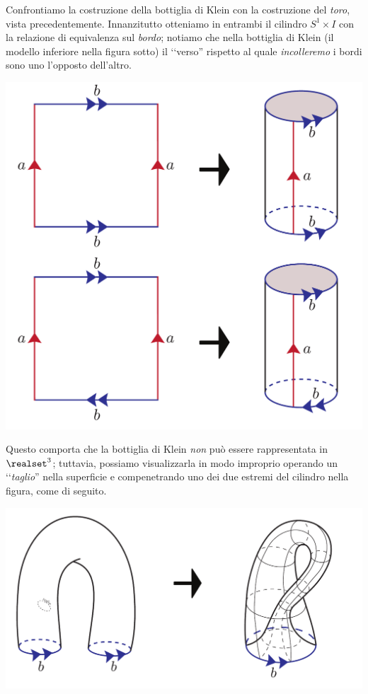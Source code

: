 \begin{examples}
\begin{itemize}
\begin{center}
		\end{center}
		Confrontiamo la costruzione della bottiglia di Klein con la costruzione del \textit{toro}, vista precedentemente. Innanzitutto otteniamo in entrambi il cilindro $S^1\times I$ con la relazione di equivalenza sul \textit{bordo}; notiamo che nella bottiglia di Klein (il modello inferiore nella figura sotto) il ‘‘verso'' rispetto al quale \textit{incolleremo} i bordi sono uno l'opposto dell'altro.
		\begin{center}
			\includegraphics[trim=0cm 0cm 0cm 0cm, clip, scale=0.375]{images/kleintorus.pdf}
		\end{center}
	Questo comporta che la bottiglia di Klein \textit{non} può essere rappresentata in $\realset^3$; tuttavia, possiamo visualizzarla in modo improprio operando un ‘‘\textit{taglio}'' nella superficie e compenetrando uno dei due estremi del cilindro nella figura, come di seguito.
	 \begin{center}
	 	\includegraphics[trim=0cm 0cm 0cm 0cm, clip, scale=0.375]{images/kleinconstruction.pdf}
	 \end{center}
	\end{itemize}
\end{examples}

